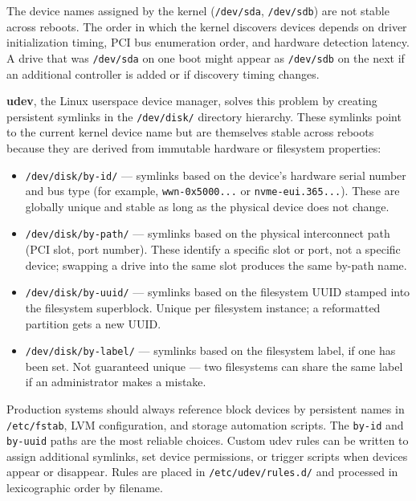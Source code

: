 The device names assigned by the kernel (\texttt{/dev/sda}, \texttt{/dev/sdb}) are not stable across reboots. The order in which the kernel discovers devices depends on driver initialization timing, PCI bus enumeration order, and hardware detection latency. A drive that was \texttt{/dev/sda} on one boot might appear as \texttt{/dev/sdb} on the next if an additional controller is added or if discovery timing changes.

\textbf{udev}, the Linux userspace device manager, solves this problem by creating persistent symlinks in the \texttt{/dev/disk/} directory hierarchy. These symlinks point to the current kernel device name but are themselves stable across reboots because they are derived from immutable hardware or filesystem properties:

\begin{itemize}
  \item \texttt{/dev/disk/by-id/} --- symlinks based on the device's hardware serial number and bus type (for example, \texttt{wwn-0x5000...} or \texttt{nvme-eui.365...}). These are globally unique and stable as long as the physical device does not change.
  \item \texttt{/dev/disk/by-path/} --- symlinks based on the physical interconnect path (PCI slot, port number). These identify a specific slot or port, not a specific device; swapping a drive into the same slot produces the same by-path name.
  \item \texttt{/dev/disk/by-uuid/} --- symlinks based on the filesystem UUID stamped into the filesystem superblock. Unique per filesystem instance; a reformatted partition gets a new UUID.
  \item \texttt{/dev/disk/by-label/} --- symlinks based on the filesystem label, if one has been set. Not guaranteed unique --- two filesystems can share the same label if an administrator makes a mistake.
\end{itemize}

Production systems should always reference block devices by persistent names in \texttt{/etc/fstab}, LVM configuration, and storage automation scripts. The \texttt{by-id} and \texttt{by-uuid} paths are the most reliable choices. Custom udev rules can be written to assign additional symlinks, set device permissions, or trigger scripts when devices appear or disappear. Rules are placed in \texttt{/etc/udev/rules.d/} and processed in lexicographic order by filename.


